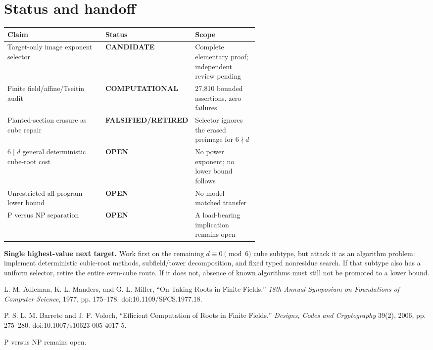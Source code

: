 \documentclass[11pt]{article}
\newcommand{\COMP}{\textbf{COMPUTATIONAL}}
\newcommand{\CAND}{\textbf{CANDIDATE}}
\newcommand{\OPEN}{\textbf{OPEN}}
\newcommand{\RET}{\textbf{FALSIFIED/RETIRED}}
\begin{document}
\section{Status and handoff}
\begin{center}
\begin{tabularx}{0.98\linewidth}{p{0.39\linewidth}p{0.20\linewidth}X}
\toprule
Claim & Status & Scope \\
\midrule
Target-only image exponent selector & \CAND & Complete elementary proof; independent review pending \\
Finite field/affine/Tseitin audit & \COMP & 27,810 bounded assertions, zero failures \\
Planted-section erasure as cube repair & \RET & Selector ignores the erased preimage for $6\nmid d$ \\
$6\mid d$ general deterministic cube-root cost & \OPEN & No power exponent; no lower bound follows \\
Unrestricted all-program lower bound & \OPEN & No model-matched transfer \\
P versus NP separation & \OPEN & A load-bearing implication remains open \\
\bottomrule
\end{tabularx}
\end{center}

\textbf{Single highest-value next target.}
Work first on the remaining $d\equiv0\pmod6$ cube subtype, but attack it as an
algorithm problem: implement deterministic cubic-root methods, subfield/tower
decomposition, and fixed typed nonresidue search.  If that subtype also has a
uniform selector, retire the entire even-cube route.  If it does not, absence
of known algorithms must still not be promoted to a lower bound.

\begin{thebibliography}{9}
L. M. Adleman, K. L. Manders, and G. L. Miller,
``On Taking Roots in Finite Fields,''
\emph{18th Annual Symposium on Foundations of Computer Science}, 1977,
pp. 175--178. doi:10.1109/SFCS.1977.18.

P. S. L. M. Barreto and J. F. Voloch,
``Efficient Computation of Roots in Finite Fields,''
\emph{Designs, Codes and Cryptography} 39(2), 2006, pp. 275--280.
doi:10.1007/s10623-005-4017-5.
\end{thebibliography}

\bigskip
\noindent P versus NP remains open.
\end{document}
